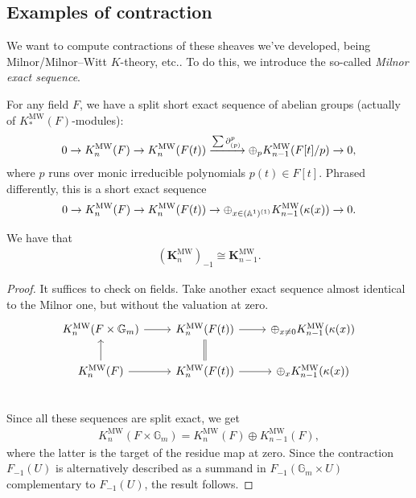 \documentclass[11pt,openany]{book}
\let\del\partial
\providecommand{\MW}{\mathrm{MW}}
\providecommand{\KMW}{\mathbf{K}^\mathrm{MW}}
\begin{document}
\subsection{Examples of contraction}

We want to compute contractions of these sheaves we've developed, being Milnor/Milnor--Witt $K$-theory, etc.. To do this, we introduce the so-called \textit{Milnor exact sequence}.

\begin{theorem} \cite[3.24]{Morel}
For any field $F$, we have a split short exact sequence of abelian groups (actually of $K_\ast^\MW(F)$-modules):
\begin{align*}
    0 \to K_n^\MW(F) \to K_n^\MW(F(t)) \xto{\sum \del^p_{(p)}} \oplus_p K_{n-1}^\MW(F[t]/p) \to 0,
\end{align*}
where $p$ runs over monic irreducible polynomials $p(t) \in F[t]$. Phrased differently, this is a short exact sequence
\begin{align*}
    0 \to K_n^\MW(F) \to K_n^\MW(F(t)) \to \oplus_{x\in(\A^1)^{(1)}} K_{n-1}^\MW(\kappa(x)) \to 0.
\end{align*}
\end{theorem}


\begin{corollary}\label{cor:contraction-MW} 
We have that
\begin{align*}
    \left( \KMW_n \right)_{-1} \cong \KMW_{n-1}.
\end{align*}
\end{corollary}
\begin{proof} It suffices to check on fields. Take another exact sequence almost identical to the Milnor one, but without the valuation at zero.
\[ \begin{tikzcd}
    K_n^\MW(F \times \mathbb{G}_m)\rar & K_n^\MW(F(t))\rar & \oplus_{x\ne 0} K_{n-1}^\MW(\kappa(x))\\
    K_n^\MW(F)\uar\rar & K_n^\MW(F(t))\uar[equal]\rar &\oplus_{x} K_{n-1}^\MW(\kappa(x)) \\
\end{tikzcd} \]
Since all these sequences are split exact, we get
\begin{align*}
    K_n^\MW(F \times \mathbb{G}_m) = K_n^\MW(F) \oplus K_{n-1}^\MW(F),
\end{align*}
where the latter is the target of the residue map at zero. Since the contraction $F_{-1}(U)$ is alternatively described as a summand in $F_{-1}(\mathbb{G}_m \times U)$ complementary to $F_{-1}(U)$, the result follows.
\end{proof}
\end{document}
